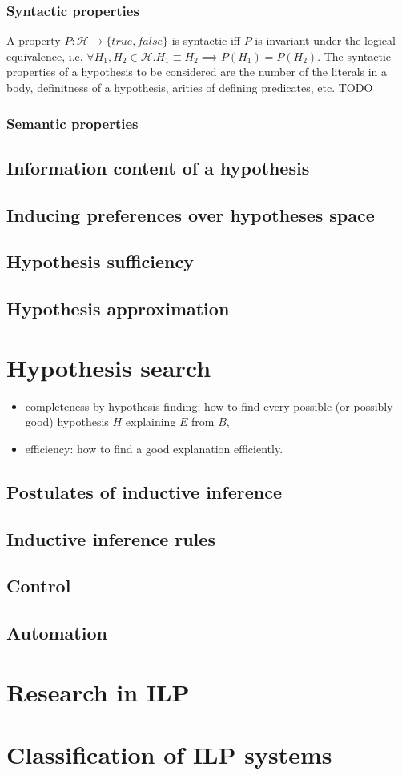 \subsubsection{Syntactic properties}
A property $P:\mathcal{H} \to \{true, false\}$ is syntactic iff $P$ is invariant under the logical equivalence, i.e.
$\forall H_1, H_2 \in \mathcal{H}. H_1 \equiv H_2 \implies P(H_1)=P(H_2)$.
The syntactic properties of a hypothesis to be considered are the number of the literals in a body, definitness of a hypothesis, arities of defining predicates, etc. TODO


\subsubsection{Semantic properties}

\subsection{Information content of a hypothesis}

\subsection{Inducing preferences over hypotheses space}
\subsection{Hypothesis sufficiency}
\subsection{Hypothesis approximation}

\section{Hypothesis search}
\begin{itemize}
\item completeness by hypothesis finding: how to find every possible (or possibly good) hypothesis $H$ explaining $E$ from $B$,
\item efficiency: how to find a good explanation efficiently. 
\end{itemize}
\subsection{Postulates of inductive inference}
\subsection{Inductive inference rules}
\subsection{Control}
\subsection{Automation}
\section{Research in ILP}
\section{Classification of ILP systems}